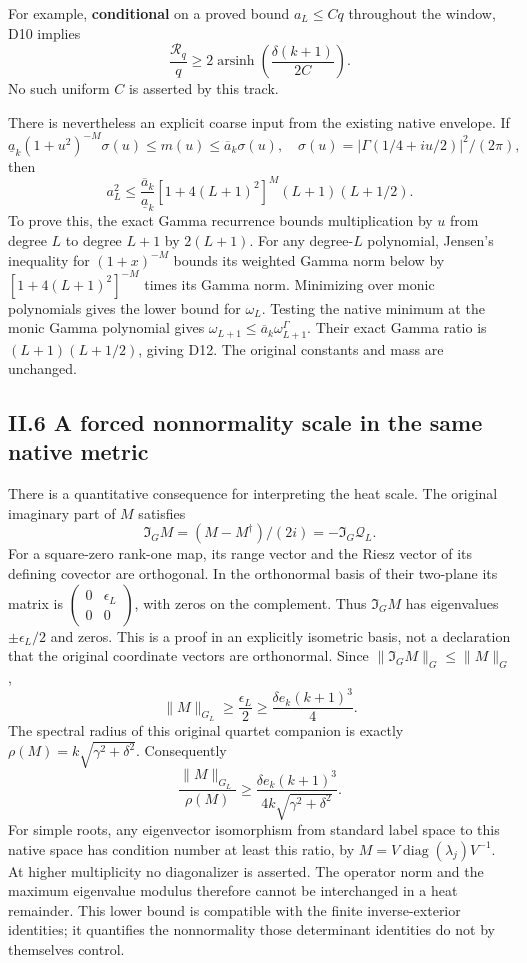 For example, \textbf{conditional} on a proved bound \(a_L\le Cq\)
throughout the window, D10 implies \[
\frac{\mathcal R_q}{q}\ge
2\operatorname{arsinh}\left(\frac{\delta(k+1)}{2C}\right).
\tag{D11}
\] No such uniform \(C\) is asserted by this track.

There is nevertheless an explicit coarse input from the existing native
envelope. If \[
\underline a_k(1+u^2)^{-M}\sigma(u)\le m(u)
\le\overline a_k\sigma(u),\quad
\sigma(u)=|\Gamma(1/4+iu/2)|^2/(2\pi),
\] then \[
\boxed{
a_L^2\le\frac{\overline a_k}{\underline a_k}
[1+4(L+1)^2]^M(L+1)(L+1/2).
}
\tag{D12}
\] To prove this, the exact Gamma recurrence bounds multiplication by
\(u\) from degree \(L\) to degree \(L+1\) by \(2(L+1)\). For any
degree-\(L\) polynomial, Jensen's inequality for \((1+x)^{-M}\) bounds
its weighted Gamma norm below by \([1+4(L+1)^2]^{-M}\) times its Gamma
norm. Minimizing over monic polynomials gives the lower bound for
\(\omega_L\). Testing the native minimum at the monic Gamma polynomial
gives \(\omega_{L+1}\le\overline a_k\omega^\Gamma_{L+1}\). Their exact
Gamma ratio is \((L+1)(L+1/2)\), giving D12. The original constants and
mass are unchanged.

\subsection{II.6 A forced nonnormality scale in the same native
metric}\label{ii.6-a-forced-nonnormality-scale-in-the-same-native-metric}

There is a quantitative consequence for interpreting the heat scale. The
original imaginary part of \(M\) satisfies \[
\Im_GM=(M-M^\dagger)/(2i)=-\Im_G\mathcal Q_L.
\] For a square-zero rank-one map, its range vector and the Riesz vector
of its defining covector are orthogonal. In the orthonormal basis of
their two-plane its matrix is
\(\left(\begin{smallmatrix}0&\epsilon_L\\0&0\end{smallmatrix}\right)\),
with zeros on the complement. Thus \(\Im_GM\) has eigenvalues
\(\pm\epsilon_L/2\) and zeros. This is a proof in an explicitly
isometric basis, not a declaration that the original coordinate vectors
are orthonormal. Since \(\|\Im_GM\|_G\le\|M\|_G\), \[
\boxed{\|M\|_{G_L}\ge\frac{\epsilon_L}{2}
\ge\frac{\delta e_k(k+1)^3}{4}.}
\tag{D13}
\] The spectral radius of this original quartet companion is exactly
\(\rho(M)=k\sqrt{\gamma^2+\delta^2}\). Consequently \[
\frac{\|M\|_{G_L}}{\rho(M)}
\ge\frac{\delta e_k(k+1)^3}{4k\sqrt{\gamma^2+\delta^2}}.
\] For simple roots, any eigenvector isomorphism from standard label
space to this native space has condition number at least this ratio, by
\(M=V\operatorname{diag}(\lambda_j)V^{-1}\). At higher multiplicity no
diagonalizer is asserted. The operator norm and the maximum eigenvalue
modulus therefore cannot be interchanged in a heat remainder. This lower
bound is compatible with the finite inverse-exterior identities; it
quantifies the nonnormality those determinant identities do not by
themselves control.


